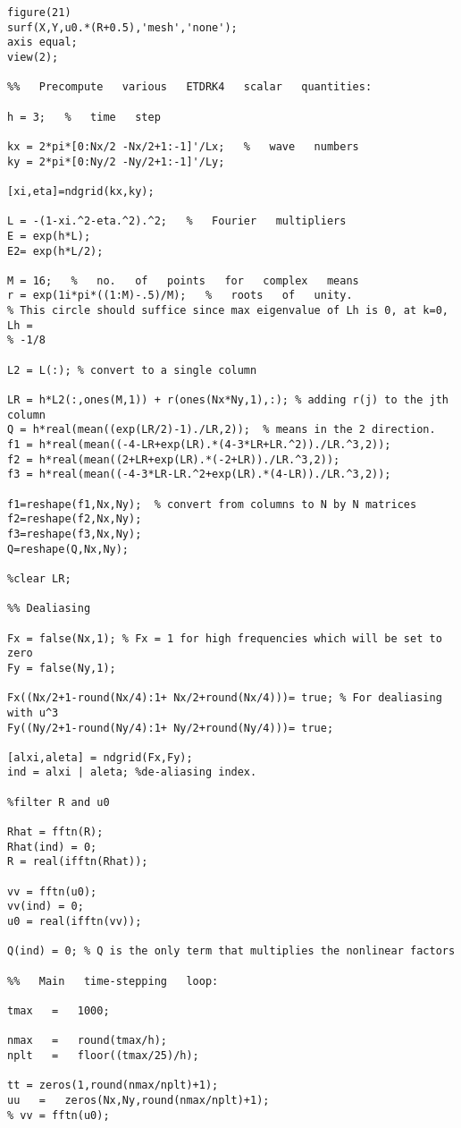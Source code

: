 \documentclass[12pt]{article}
\begin{document}
\begin{verbatim}
figure(21)
surf(X,Y,u0.*(R+0.5),'mesh','none');
axis equal;
view(2);

%%   Precompute   various   ETDRK4   scalar   quantities:

h = 3;   %   time   step

kx = 2*pi*[0:Nx/2 -Nx/2+1:-1]'/Lx;   %   wave   numbers
ky = 2*pi*[0:Ny/2 -Ny/2+1:-1]'/Ly;

[xi,eta]=ndgrid(kx,ky);

L = -(1-xi.^2-eta.^2).^2;   %   Fourier   multipliers
E = exp(h*L);   
E2= exp(h*L/2);

M = 16;   %   no.   of   points   for   complex   means
r = exp(1i*pi*((1:M)-.5)/M);   %   roots   of   unity. 
% This circle should suffice since max eigenvalue of Lh is 0, at k=0, Lh =
% -1/8

L2 = L(:); % convert to a single column

LR = h*L2(:,ones(M,1)) + r(ones(Nx*Ny,1),:); % adding r(j) to the jth column
Q = h*real(mean((exp(LR/2)-1)./LR,2));  % means in the 2 direction.
f1 = h*real(mean((-4-LR+exp(LR).*(4-3*LR+LR.^2))./LR.^3,2));
f2 = h*real(mean((2+LR+exp(LR).*(-2+LR))./LR.^3,2));
f3 = h*real(mean((-4-3*LR-LR.^2+exp(LR).*(4-LR))./LR.^3,2));

f1=reshape(f1,Nx,Ny);  % convert from columns to N by N matrices
f2=reshape(f2,Nx,Ny); 
f3=reshape(f3,Nx,Ny);
Q=reshape(Q,Nx,Ny); 

%clear LR;

%% Dealiasing

Fx = false(Nx,1); % Fx = 1 for high frequencies which will be set to zero
Fy = false(Ny,1); 

Fx((Nx/2+1-round(Nx/4):1+ Nx/2+round(Nx/4)))= true; % For dealiasing with u^3
Fy((Ny/2+1-round(Ny/4):1+ Ny/2+round(Ny/4)))= true;

[alxi,aleta] = ndgrid(Fx,Fy); 
ind = alxi | aleta; %de-aliasing index.

%filter R and u0

Rhat = fftn(R);
Rhat(ind) = 0;
R = real(ifftn(Rhat));

vv = fftn(u0);
vv(ind) = 0;
u0 = real(ifftn(vv));

Q(ind) = 0; % Q is the only term that multiplies the nonlinear factors

%%   Main   time-stepping   loop:

tmax   =   1000;   

nmax   =   round(tmax/h);   
nplt   =   floor((tmax/25)/h);

tt = zeros(1,round(nmax/nplt)+1);
uu   =   zeros(Nx,Ny,round(nmax/nplt)+1);   
% vv = fftn(u0);


\end{verbatim}
\end{document}
